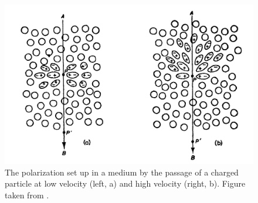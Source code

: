 \begin{figure}[ht] 
        \centering \includegraphics[width=0.7\columnwidth]{figures/dipole.png}

        \caption{
                \label{fig:jelley} %
                The polarization set up in a medium by the passage of a charged particle at low velocity (left, a) and high velocity (right, b). Figure taken from \cite{jelley}.
        }
\end{figure}
